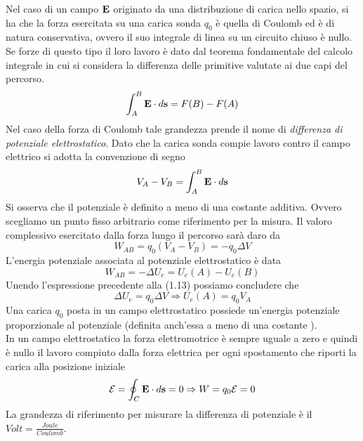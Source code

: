 \noindent Nel caso di un campo $\bold{E}$ originato da una distribuzione di carica nello spazio, si ha che la forza esercitata su una carica sonda $q_0$ \`e quella di Coulomb ed \`e di natura conservativa, ovvero il suo integrale di linea su un circuito chiuso \`e nullo. Se forze di questo tipo il loro lavoro \`e dato dal teorema fondamentale del calcolo integrale in cui si considera la differenza delle primitive valutate ai due capi del percorso.
\begin{equation*}
	\int_{A}^{B} \bold{E} \cdot d \bold{s} = F(B) -F(A)
\end{equation*} 
Nel caso della forza di Coulomb tale grandezza prende il nome di \textit{differenza di potenziale elettrostatico}. Dato che la carica sonda compie lavoro contro il campo elettrico si adotta la convenzione di segno
\begin{equation}
	V_A -V_B = \int_{A}^{B} \bold{E} \cdot d\bold{s}
\end{equation}
Si osserva che il potenziale \`e definito a meno di una costante additiva. Ovvero scegliamo un punto fisso arbitrario come riferimento per la misura.
Il valoro complessivo esercitato dalla forza lungo il percorso sar\`a daro da 
\begin{equation}
	W_{AB} = q_0(V_A - V_B) = -q_0 \Delta V
\end{equation}
L'energia potenziale associata al potenziale elettrostatico \`e data 
\begin{equation*}
	W_{AB} = - \Delta U_e = U_e(A) - U_e(B)
\end{equation*}
Unendo l'espressione precedente alla (1.13) possiamo concludere che 
\begin{equation*}
	\Delta U_e =q_0\Delta V \Rightarrow U_e(A) = q_0 V_A 
\end{equation*}
Una carica $q_0$ posta in un campo elettrostatico possiede un'energia potenziale proporzionale al potenziale (definita anch'essa a meno di una costante ).
\\
\noindent In un campo elettrostatico la forza elettromotrice \`e sempre uguale a zero e quindi \`e nullo il lavoro compiuto dalla forza elettrica per ogni spostamento che riporti la carica alla posizione iniziale 
\begin{equation*}
	\mathcal{E} = \oint_{C} \bold{E} \cdot d\bold{s} = 0 \Rightarrow W = q_0 \mathcal{E} = 0
\end{equation*}
La grandezza di riferimento per misurare la differenza di potenziale \`e il $Volt = \frac{Joule}{Coulomb}$.

